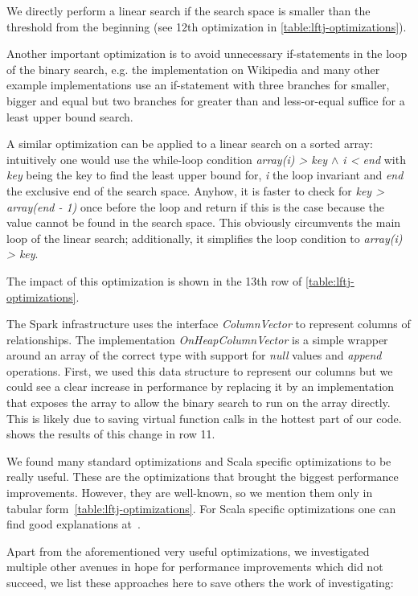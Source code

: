 We directly perform a linear search if the search space is smaller than the threshold from the beginning (see 12th optimization in
\cref{table:lftj-optimizations}).

Another important optimization is to avoid unnecessary if-statements in the loop of the binary
search, e.g. the implementation on Wikipedia and many other example implementations use an
if-statement with three branches for smaller, bigger and equal but two branches for greater than and less-or-equal suffice for a least upper bound search.

A similar optimization can be applied to a linear search on a sorted array: intuitively one would use the while-loop condition
\textit{array(i) > key $\wedge$ i < end} with \textit{key} being the key to find the least upper bound for, \textit{i} the loop invariant
and \textit{end} the exclusive end of the search space.
Anyhow, it is faster to check for \textit{key > array(end - 1)} once before the loop and return if this is the case because the value
cannot be found in the search space.
This obviously circumvents the main loop of the linear search;
additionally, it simplifies the loop condition to \textit{array(i) > key}.

The impact of this optimization is shown in the 13th row of \cref{table:lftj-optimizations}.

The Spark infrastructure uses the interface \textit{ColumnVector} to represent columns of relationships.
The implementation \textit{OnHeapColumnVector} is a simple wrapper around an array of the correct type with support for \textit{null} values and \textit{append} operations.
First, we used this data structure to represent our columns but we could see a clear increase in performance by replacing it by an implementation that exposes the array
to allow the binary search to run on the array directly.
This is likely due to saving virtual function calls in the hottest part of our code.
 shows the results of this change in row 11.

We found many standard optimizations and Scala specific optimizations to be really useful.
These are the optimizations that brought the biggest performance improvements.
However, they are well-known, so we mention them only in tabular form~\ref{table:lftj-optimizations}.
For Scala specific optimizations one can find good explanations at~\cite{databricks-scala-guide}.

Apart from the aforementioned very useful optimizations, we investigated multiple other avenues in hope for performance improvements
which did not succeed, we list these approaches here to save others the work of investigating:

